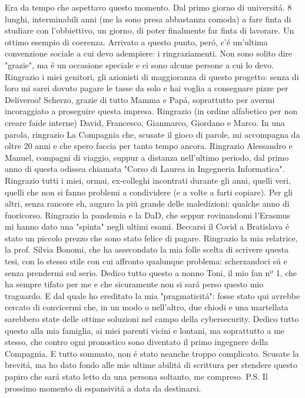 \begin{acknowledgments}
Era da tempo che aspettavo questo momento. Dal primo giorno di universitá. 8 lunghi, interminabili anni (me la sono presa abbastanza comoda) a fare finta di studiare con l'obbiettivo, un giorno, di poter finalmente far finta di lavorare. Un ottimo esempio di coerenza. Arrivato a questo punto, peró, c'é un'ultima convenzione sociale a cui devo adempiere: i ringraziamenti. Non sono solito dire "grazie", ma é un occasione speciale e ci sono alcune persone a cui lo devo.\newline
Ringrazio i miei genitori, gli azionisti di maggioranza di questo progetto: senza di loro mi sarei dovuto pagare le tasse da solo e hai voglia a consegnare pizze per Deliveroo! Scherzo, grazie di tutto Mamma e Papá, soprattutto per avermi incoraggiato a proseguire questa impresa.\newline
Ringrazio (in ordine alfabetico per non creare faide interne) David, Francesco, Gianmarco, Giordano e Marco. In una parola, ringrazio La Compagnia che, scusate il gioco di parole, mi accompagna da oltre 20 anni e che spero faccia per tanto tempo ancora.\newline
Ringrazio Alessandro e Manuel, compagni di viaggio, suppur a distanza nell'ultimo periodo, dal primo anno di questa odissea chiamata "Corso di Laurea in Ingegneria Informatica".\newline
Ringrazio tutti i miei, ormai, ex-colleghi incontrati durante gli anni, quelli veri, quelli che non si fanno problemi a condividere (e a volte a farti copiare). Per gli altri, senza rancore eh, auguro la piú grande delle maledizioni: qualche anno di fuoricorso.\newline
Ringrazio la pandemia e la DaD, che seppur rovinandomi l'Erasmus mi hanno dato una "spinta" negli ultimi esami. Beccarsi il Covid a Bratislava é stato un piccolo prezzo che sono stato felice di pagare.\newline
Ringrazio la mia relatrice, la prof. Silvia Bonomi, che ha assecondato la mia folle scelta di scrivere questa tesi, con lo stesso stile con cui affronto qualunque problema: scherzandoci sú e senza prendermi sul serio.\newline
Dedico tutto questo a nonno Toni, il mio fan nº 1, che ha sempre tifato per me e che sicuramente non si sará perso questo mio traguardo. E dal quale ho ereditato la mia "pragmaticitá": fosse stato qui avrebbe cercato di convicermi che, in un modo o nell'altro, due chiodi e una martellata sarebbero state delle ottime soluzioni nel campo della cybersecurity.\newline
Dedico tutto questo alla mia famiglia, ai miei parenti vicini e lontani, ma soprattutto a me stesso, che contro ogni pronostico sono diventato il primo ingegnere della Compagnia. E tutto sommato, non é stato neanche troppo complicato.\newline
Scusate la brevitá, ma ho dato fondo alle mie ultime abilitá di scrittura per stendere questo papiro che sará stato letto da una persona soltanto, me compreso.\vspace{1cm}\newline
P.S. Il prossimo momento di espansivitá a data da destinarsi.

\end{acknowledgments}